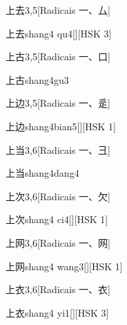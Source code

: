 \begin{entry}{上去}{3,5}[Radicais ⼀、⼛]
  \begin{phonetics}{上去}{shang4 qu4}[][HSK 3]
  \end{phonetics}
\end{entry}

\begin{entry}{上古}{3,5}[Radicais ⼀、⼝]
  \begin{phonetics}{上古}{shang4gu3}
  \end{phonetics}
\end{entry}

\begin{entry}{上边}{3,5}[Radicais ⼀、⾡]
  \begin{phonetics}{上边}{shang4bian5}[][HSK 1]
  \end{phonetics}
\end{entry}

\begin{entry}{上当}{3,6}[Radicais ⼀、⼹]
  \begin{phonetics}{上当}{shang4dang4}
  \end{phonetics}
\end{entry}

\begin{entry}{上次}{3,6}[Radicais ⼀、⽋]
  \begin{phonetics}{上次}{shang4 ci4}[][HSK 1]
  \end{phonetics}
\end{entry}

\begin{entry}{上网}{3,6}[Radicais ⼀、⽹]
  \begin{phonetics}{上网}{shang4 wang3}[][HSK 1]
  \end{phonetics}
\end{entry}

\begin{entry}{上衣}{3,6}[Radicais ⼀、⾐]
  \begin{phonetics}{上衣}{shang4 yi1}[][HSK 3]
  \end{phonetics}
\end{entry}

